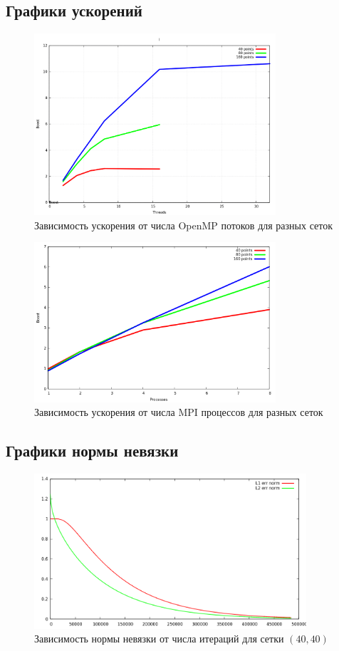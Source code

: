 \documentclass[oneside,final,14pt]{extreport}
\begin{document}
\subsection{Графики ускорений}
\begin{figure}[ht!]
  \centering
  \includegraphics[width=0.8\textwidth]{picture5}
  \caption{Зависимость ускорения от числа OpenMP потоков для разных сеток}
\end{figure}
\begin{figure}[h!]
  \centering
  \includegraphics[width=0.8\textwidth]{picture10}
  \caption{Зависимость ускорения от числа MPI процессов для разных сеток}
\end{figure}


\newpage
\subsection{Графики нормы невязки}
\begin{figure}[ht!]
  \centering
  \includegraphics[width=0.9\textwidth]{picture6}
  \caption{Зависимость нормы невязки от числа итераций для сетки \((40, 40)\)}
\end{figure}
\end{document}
